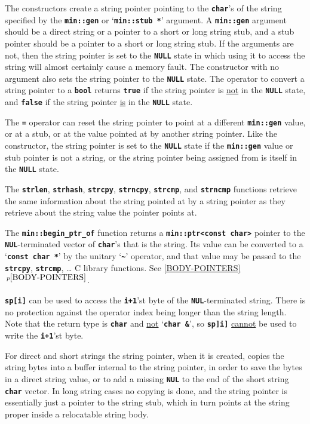 \documentclass[12pt]{article}
\newcommand{\TT}[1]{{\tt \bfseries #1}}
\newcommand{\itemref}[1]{\ref{#1}$\,^{p\pageref{#1}}$}
\begin{document}
The constructors create a string pointer pointing to the \TT{char}'s
of the string specified by the \TT{min::gen} or
`\TT{min::stub *}' argument.  A \TT{min::gen} argument
should be a direct string or a pointer to a short or long string stub,
and a stub pointer should be a pointer to a short or long string stub.
If the arguments are not, then the string pointer is set to the
\TT{NULL} state in which using it to access the string will almost
certainly cause a memory fault.  The constructor with no argument also
sets the string pointer to the \TT{NULL} state.  The operator to
convert a string pointer to a \TT{bool} returns \TT{true} if the
string pointer is \underline{not} in the \TT{NULL} state, and \TT{false}
if the string pointer \underline{is} in the \TT{NULL} state.

The \TT{=} operator can reset the string
pointer to point at a different \TT{min::gen} value, or at a stub,
or at the
value pointed at by another string pointer.  Like the constructor,
the string pointer is set to the \TT{NULL} state
if the \TT{min::gen} value or stub pointer is not a string,
or the string pointer being assigned from is itself in the \TT{NULL} state.

The \TT{strlen}, \TT{strhash}, \TT{strcpy}, \TT{strncpy},
\TT{strcmp}, and \TT{strncmp} functions retrieve the same information
about the string pointed at by a string pointer as they retrieve about
the string value the pointer points at.

The \TT{min::begin\_ptr\_of} function
returns a \TT{min::ptr<const char>} pointer to
the \TT{NUL}-termin\-at\-ed vector of \TT{char}'s that is the string.
Its value can be converted to a `\TT{const char *}' by the unitary
`\TT{\textasciitilde}' operator, and that value
may be passed to the \TT{strcpy}, \TT{strcmp}, \ldots{}
C library functions.
See \itemref{BODY-POINTERS}.

\TT{sp[i]} can be used to access the \TT{i+1}'st byte of
the \TT{NUL}-terminated string.
There is no protection against the operator index
being longer than the string length.
Note that the return type is \TT{char} and \underline{not} `\TT{char \&}',
so \TT{sp]i]} \underline{cannot} be used to write the \TT{i+1}'st byte.

For direct and short strings the string pointer, when it is created,
copies the string bytes into a buffer internal to the string pointer,
in order to save the bytes in a direct string value, or to
add a missing \TT{NUL} to the end of the short string \TT{char} vector.
In long string cases no copying is done, and the string pointer
is essentially just a pointer to the string stub, which in turn points
at the string proper inside a relocatable string body.
\end{document}
